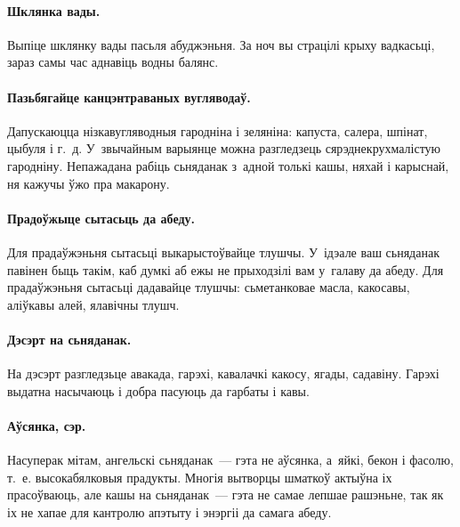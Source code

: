 \paragraph{Шклянка вады.}
Выпіце шклянку вады пасьля абуджэньня. За ноч вы страцілі крыху вадкасьці, зараз самы час аднавіць водны балянс.

\paragraph{Пазьбягайце канцэнтраваных вугляводаў.}
Дапускаюцца нізкавугляводныя гародніна і зеляніна: капуста, салера, шпінат, цыбуля і г.~д. У~звычайным варыянце можна разгледзець сярэднекрухмалістую гародніну. Непажадана рабіць сьняданак з~адной толькі кашы, няхай і карыснай, ня кажучы ўжо пра макарону.

\paragraph{Прадоўжыце сытасьць да абеду.}
Для прадаўжэньня сытасьці выкарыстоўвайце тлушчы. У~ідэале ваш сьняданак павінен быць такім, каб думкі аб ежы не прыходзілі вам у~галаву да абеду. Для прадаўжэньня сытасьці дадавайце тлушчы: сьметанковае масла, какосавы, аліўкавы алей, ялавічны тлушч.

\paragraph{Дэсэрт на сьняданак.}
На дэсэрт разгледзьце авакада, гарэхі, кавалачкі какосу, ягады, садавіну. Гарэхі выдатна насычаюць і добра пасуюць да гарбаты і кавы.

\paragraph{Аўсянка, сэр.}
Насуперак мітам, ангельскі сьняданак~--- гэта не аўсянка, а~яйкі, бекон і фасолю, т.~е. высокабялковыя прадукты. Многія вытворцы шматкоў актыўна іх прасоўваюць, але кашы на сьняданак~--- гэта не самае лепшае рашэньне, так як іх не хапае для кантролю апэтыту і энэргіі да самага абеду.
